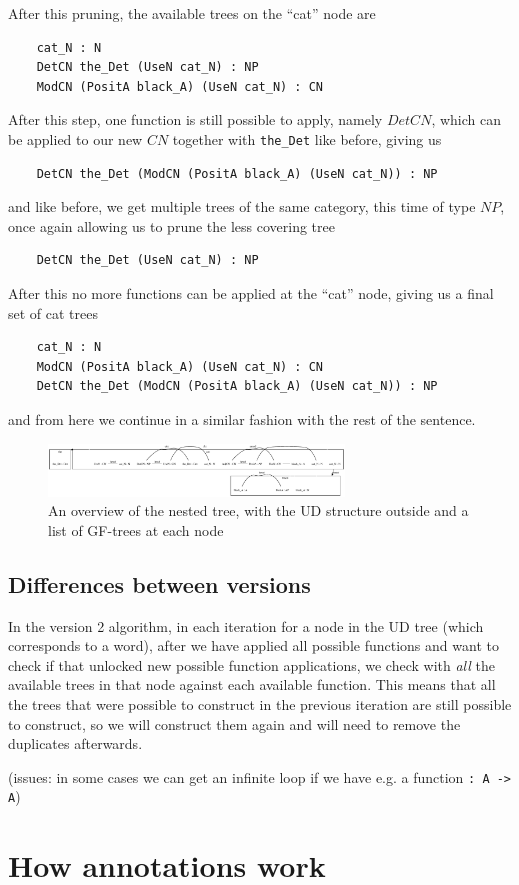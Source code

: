 After this pruning, the available trees on the ``cat'' node are
\begin{lstlisting}
    cat_N : N
    DetCN the_Det (UseN cat_N) : NP
    ModCN (PositA black_A) (UseN cat_N) : CN
\end{lstlisting}
After this step, one function is still possible to apply, namely $DetCN$, which can be applied to our new $CN$ together with \lstinline{the_Det} like before, giving us
\begin{lstlisting}
    DetCN the_Det (ModCN (PositA black_A) (UseN cat_N)) : NP
\end{lstlisting}
and like before, we get multiple trees of the same category, this time of type $NP$, once again allowing us to prune the less covering tree
\begin{lstlisting}
    DetCN the_Det (UseN cat_N) : NP
\end{lstlisting}

After this no more functions can be applied at the ``cat'' node, giving us a final set of cat trees
\begin{lstlisting}
    cat_N : N
    ModCN (PositA black_A) (UseN cat_N) : CN
    DetCN the_Det (ModCN (PositA black_A) (UseN cat_N)) : NP
\end{lstlisting}

and from here we continue in a similar fashion with the rest of the sentence.

\begin{figure}
    \centering
    \includegraphics[width=0.7\textwidth]{figure/black_cats/he_black_cat_graph.eps}
    \caption{An overview of the nested tree, with the UD structure outside and a list of GF-trees at each node}\label{fig:final nested tree}
\end{figure}


\subsection{Differences between versions}

In the version 2 algorithm, in each iteration for a node in the UD tree (which corresponds to a word), after we have applied all possible functions and want to check if that unlocked new possible function applications, we check with \emph{all} the available trees in that node against each available function. This means that all the trees that were possible to construct in the previous iteration are still possible to construct, so we will construct them again and will need to remove the duplicates afterwards.



(issues: in some cases we can get an infinite loop if we have e.g. a function \lstinline{: A -> A})



\section{How annotations work}